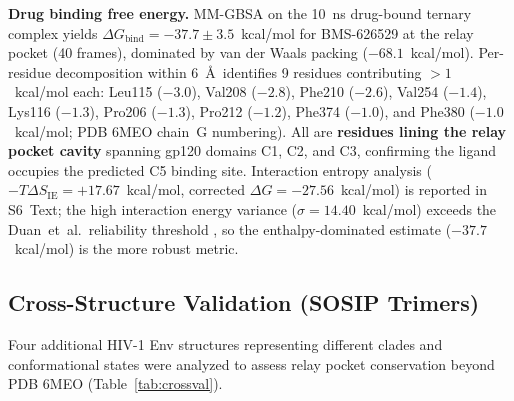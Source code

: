 \documentclass[11pt,a4paper]{article}
\begin{document}
\textbf{Drug binding free energy.} MM-GBSA on the 10~ns drug-bound ternary complex yields $\Delta G_\mathrm{bind} = -37.7 \pm 3.5$~kcal/mol for BMS-626529 at the relay pocket (40 frames), dominated by van der Waals packing ($-68.1$~kcal/mol). Per-residue decomposition within 6~\AA\ identifies 9 residues contributing $>1$~kcal/mol each: Leu115 ($-3.0$), Val208 ($-2.8$), Phe210 ($-2.6$), Val254 ($-1.4$), Lys116 ($-1.3$), Pro206 ($-1.3$), Pro212 ($-1.2$), Phe374 ($-1.0$), and Phe380 ($-1.0$~kcal/mol; PDB 6MEO chain~G numbering). All are \textbf{residues lining the relay pocket cavity} spanning gp120 domains C1, C2, and C3, confirming the ligand occupies the predicted C5 binding site. Interaction entropy analysis ($-T\Delta S_\mathrm{IE} = +17.67$~kcal/mol, corrected $\Delta G = -27.56$~kcal/mol) is reported in S6~Text; the high interaction energy variance ($\sigma = 14.40$~kcal/mol) exceeds the Duan~et~al.\ reliability threshold \citep{Duan2016}, so the enthalpy-dominated estimate ($-37.7$~kcal/mol) is the more robust metric.

\subsection{Cross-Structure Validation (SOSIP Trimers)}

Four additional HIV-1 Env structures representing different clades and conformational states were analyzed to assess relay pocket conservation beyond PDB 6MEO (Table~\ref{tab:crossval}).
\end{document}
